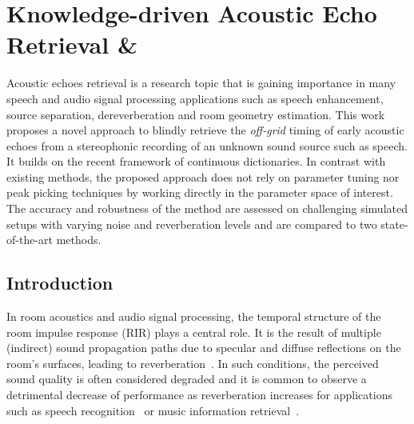 \chapter{Knowledge-driven Acoustic Echo Retrieval \& \blaster}\label{chap:blaster}

 Acoustic echoes retrieval is a research topic that is gaining importance in many speech and audio signal processing applications
such as speech enhancement, source separation, dereverberation and room geometry estimation.
This work proposes a novel approach to blindly retrieve the \textit{off-grid} timing of early acoustic echoes %
from a stereophonic recording of an unknown sound source such as speech. It builds on the recent framework of continuous dictionaries.
In contrast with existing methods, the proposed approach does not rely on parameter tuning nor peak picking techniques by working directly in the parameter space of interest.
The accuracy and robustness of the method are assessed on challenging simulated setups with varying noise and reverberation levels and are compared to two state-of-the-art methods.

\section{Introduction}
\label{sec:blaster:intro}
In room acoustics and audio signal processing, the temporal structure of the room impulse response (RIR) plays a central role.
It is the result of multiple (indirect) sound propagation paths due to specular and diffuse reflections on the room's surfaces, leading to reverberation~\cite{Wang2011}.
In such conditions, the perceived sound quality is often considered degraded and it is common to observe a detrimental decrease of performance as reverberation increases for applications such as speech recognition~\cite{Yoshoka2012} or music information retrieval~\cite{Barthet2010}.

